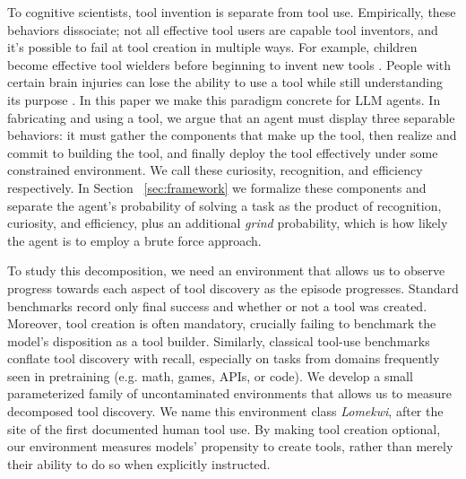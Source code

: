 \documentclass{article}
\begin{document}
To cognitive scientists, tool invention is separate from tool use. Empirically, these behaviors dissociate; not all effective tool users are capable tool inventors, and it’s possible to fail at tool creation in multiple ways. For example, children become effective tool wielders before beginning to invent new tools \citep{neldner2020crosscultural}. People with certain brain injuries can lose the ability to use a tool while still understanding its purpose \citep{goldenberg2009neural}. In this paper we make this paradigm concrete for LLM agents. In fabricating and using a tool, we argue that an agent must display three separable behaviors: it must gather the components that make up the tool, then realize and commit to building the tool, and finally deploy the tool effectively under some constrained environment. We call these curiosity, recognition, and efficiency respectively. In Section ~\ref{sec:framework} we formalize these components and separate the agent’s probability of solving a task as the product of recognition, curiosity, and efficiency, plus an additional \textit{grind} probability, which is how likely the agent is to employ a brute force approach.  

To study this decomposition, we need an environment that allows us to observe progress towards each aspect of tool discovery as the episode progresses. Standard benchmarks record only final success and whether or not a tool was created. Moreover, tool creation is often mandatory, crucially failing to benchmark the model’s disposition as a tool builder. Similarly, classical tool-use benchmarks conflate tool discovery with recall, especially on tasks from domains frequently seen in pretraining (e.g. math, games, APIs, or code). We develop a small parameterized family of uncontaminated environments that allows us to measure decomposed tool discovery. We name this environment class \textit{Lomekwi}, after the site of the first documented human tool use. By making tool creation optional, our environment measures models’ propensity to create tools, rather than merely their ability to do so when explicitly instructed.
\end{document}
